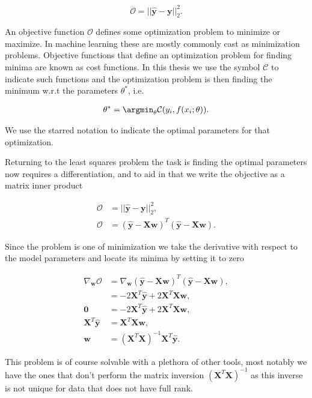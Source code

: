 \begin{equation}
\mathcal{O} = || \mathbf{\hat{y}} - \mathbf{y} ||_2 ^2.
\end{equation}

\noindent An objective function $\mathcal{O}$ defines some optimization problem to minimize or maximize. In machine learning these are mostly commonly cast as minimization problems. Objective functions that define an optimization problem for finding minima are known as cost functions. In this thesis we use the symbol $\mathcal{C}$ to indicate such functions and the optimization problem is then finding the minimum w.r.t the parameters $\theta^*$, i.e. 

\begin{align}\label{eq:cost}
\theta^* = \argmin_\theta \mathcal{C}(y_i, f(x_i; \theta)).
\end{align}

\noindent We use the starred notation to indicate the optimal parameters for that optimization.

Returning to the least squares problem the task is finding the optimal parameters now requires a differentiation, and to aid in that we write the objective as a matrix inner product 

\begin{align*}
\mathcal{O} &= || \mathbf{\hat{y}} - \mathbf{y} ||_2 ^2, \\
\mathcal{O} &= ( \mathbf{\hat{y}} - \mathbf{Xw})^T( \mathbf{\hat{y}} - \mathbf{Xw}).
\end{align*}

\noindent Since the problem is one of minimization we take the derivative with respect to the model parameters and locate its minima by setting it to zero 

\begin{align}
\nabla _{\mathbf{w}}\mathcal{O} &= \nabla _{\mathbf{w}} ( \mathbf{\hat{y}} - \mathbf{Xw})^T( \mathbf{\hat{y}} - \mathbf{Xw}), \\
&= -2\mathbf{X}^T\mathbf{\hat{y}} + 2\mathbf{X}^T\mathbf{X}\mathbf{w}, \\
\mathbf{0} &= -2\mathbf{X}^T\mathbf{\hat{y}} + 2\mathbf{X}^T\mathbf{X}\mathbf{w}, \\
\mathbf{X}^T\mathbf{\hat{y}} &= \mathbf{X}^T\mathbf{X}\mathbf{w}, \\
\mathbf{w} &=(\mathbf{X}^T\mathbf{X})^{-1} \mathbf{X}^T\mathbf{\hat{y}}. \label{eq:least_squares}
\end{align}

 \noindent This problem is of course solvable with a plethora of other tools, most notably we have the ones that don't perform the matrix inversion $(\mathbf{X}^T \mathbf{X})^{-1}$ as this inverse is not unique for data that does not have full rank.


